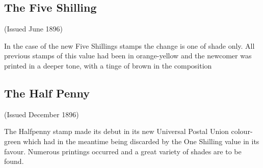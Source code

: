 \subsection{The Five Shilling}

(Issued June 1896)

In the case of the new Five Shillings stamps the change is one of shade only. All previous stamps of this value had been in orange-yellow and the newcomer was printed in a deeper tone, with a tinge of brown in the composition

 
\subsection{The Half Penny}

(Issued December 1896)

The Halfpenny stamp made its debut in its new Universal Postal Union colour-green which had in the meantime being discarded by the One Shilling value in its favour.
Numerous printings occurred and a great variety of shades are to be found.                